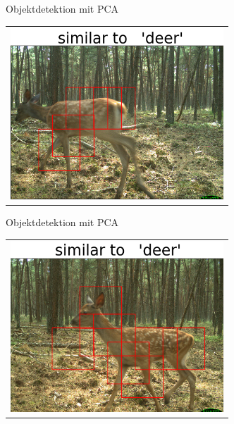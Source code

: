 \begin{frame}[t,fragile]{Objektdetektion mit  PCA}
  \vspace{0.01em}
  {
\begin{table}
\centering
        \begin{tabular}{c}
        \includegraphics[width=8cm]{images/Segmentierung/seg(4).png}\\
         \end{tabular}
\end{table}
 }

\end{frame}


\begin{frame}[t,fragile]{Objektdetektion mit  PCA}
  \vspace{0.01em}
  {
\begin{table}
\centering
        \begin{tabular}{c}
        \includegraphics[width=8cm]{images/Segmentierung/seg(5).png}\\
         \end{tabular}
\end{table}
 }

\end{frame}


